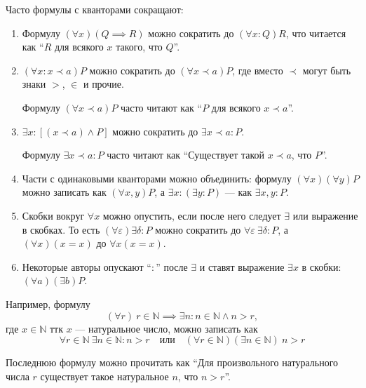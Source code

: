 Часто формулы с кванторами сокращают:
\begin{fullwidth}
	\begin{multicols}{2}
		\begin{enumerate}
			\item{}Формулу ${(\forall x)(Q\implies R)}$ можно сократить
				до ${(\forall x:Q)R}$, что читается как ``$R$ для всякого $x$ такого,
				что $Q$''.

			\item{}${(\forall x:x\prec a)P}$ можно сократить до ${(\forall x\prec a)P}$,
				где вместо $\prec$ могут быть знаки $>$, $\in$ и прочие.

				Формулу ${(\forall x\prec a)P}$ часто читают как
				``$P$ для всякого $x\prec a$''.

			\item{}$\exists x:[(x\prec a)\land P]$ можно сократить
				до $\exists x\prec a:P$.

				Формулу ${\exists x\prec a:P}$ часто читают как
				``Существует такой $x\prec a$, что $P$''.

				\columnbreak

			\item{}Части с одинаковыми кванторами можно объединить:
				формулу $(\forall x)(\forall y)P$ можно записать как $(\forall x,y)P$,
				а ${\exists x:(\exists y:P)}$ --- как $\exists x,y:P$.

			\item{}Скобки вокруг $\forall x$ можно опустить,
				если после него следует $\exists$ или выражение в скобках.
				То есть ${(\forall \varepsilon)\exists \delta:P}$
				можно сократить до $\forall \varepsilon~\exists \delta:P$,
				а $(\forall x)(x=x)$ до $\forall x(x=x)$.

			\item{}Некоторые авторы опускают ``$:$'' после $\exists$ и
				ставят выражение $\exists x$ в скобки: $(\forall a)(\exists b)P$.
		\end{enumerate}
	\end{multicols}
\end{fullwidth}

Например, формулу
\newcommand\N{\mathbb N}
\[
	(\forall r)~r\in\N\implies \exists n:n\in\N\land n>r,
\]
где $x\in\N$ ттк $x$ --- натуральное число, можно записать как
\[
	\forall r\in\N~\exists n\in\N:n>r\quad\text{или}\quad
	(\forall r\in\N)(\exists n\in\N)~n>r
\]

Последнюю формулу можно прочитать как ``Для произвольного натурального числа
$r$ существует такое натуральное $n$, что $n>r$''.

